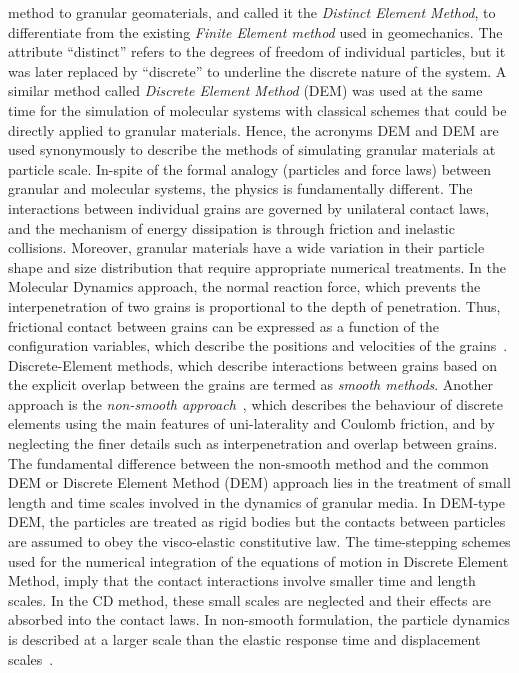 method to granular geomaterials, and called it the \textit{Distinct Element 
Method}, to 
differentiate from the existing \textit{Finite Element method} used in 
geomechanics. The attribute 
``distinct'' refers to the degrees of freedom of individual particles, but it 
was later replaced 
by 
``discrete'' to underline the discrete nature of the system. A similar method 
called 
\textit{Discrete Element Method} (DEM) was used at the same time for the 
simulation of molecular 
systems 
with classical schemes that could be directly applied to granular materials. 
Hence, the acronyms 
DEM 
and DEM are used synonymously to describe the methods of simulating granular 
materials at particle 
scale. In-spite of the formal analogy (particles and force laws) between 
granular and molecular 
systems, the physics is fundamentally different. The interactions between 
individual grains are 
governed by unilateral contact laws, and the mechanism of energy dissipation is 
through friction 
and inelastic collisions. Moreover, granular materials have a wide variation in 
their particle 
shape and size distribution that require appropriate numerical treatments. In 
the Molecular 
Dynamics approach, the normal reaction force, which prevents the 
interpenetration of two grains is 
proportional to the depth of penetration. Thus, frictional contact between 
grains can be expressed 
as a function of the configuration variables, which describe the positions and 
velocities of the 
grains~\citep{Radjai2011}. Discrete-Element methods, which describe 
interactions between grains 
based on the explicit overlap between the grains are termed as \textit{smooth 
methods}. Another 
approach is the \textit{non-smooth approach}~\citep{Jean1999}, which describes 
the behaviour of 
discrete elements using the main features of uni-laterality and Coulomb 
friction, and by 
neglecting 
the finer details such as interpenetration and overlap between grains. The 
fundamental difference 
between the non-smooth method and the common DEM or Discrete Element Method 
(DEM) approach lies in 
the 
treatment of small length and time scales involved in the dynamics of granular 
media. In DEM-type 
DEM, the particles are treated as rigid bodies but the contacts between 
particles are assumed to 
obey the visco-elastic constitutive law. The time-stepping schemes used for the 
numerical 
integration of the equations of motion in Discrete Element Method, imply that 
the contact 
interactions 
involve smaller time and length scales. In the CD method, these small scales 
are neglected and 
their effects are absorbed into the contact laws. In non-smooth formulation, 
the particle dynamics 
is described at a larger scale than the elastic response time and displacement 
scales~\citep{Jean1999, Radjai2009}. 


